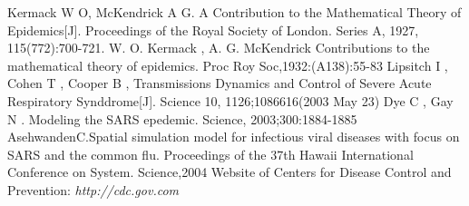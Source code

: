 \begin{thebibliography}{99}

Kermack W O, McKendrick A G. A Contribution to the Mathematical Theory of Epidemics[J]. Proceedings of the Royal Society of London. Series A, 1927, 115(772):700-721.
W. O. Kermack , A. G. McKendrick   Contributions to the mathematical theory of epidemics. Proc Roy Soc,1932:(A138):55-83
Lipsitch I , Cohen T , Cooper B , Transmissions Dynamics and Control of Severe Acute Respiratory Synddrome[J]. Science 10, 1126;1086616(2003 May 23)
Dye C , Gay N . Modeling the SARS epedemic. Science, 2003;300:1884-1885
AsehwandenC.Spatial simulation model for infectious viral diseases with focus on SARS and the common flu. Proceedings of the 37th Hawaii International Conference on System. Science,2004
Website of Centers for Disease Control and Prevention: \emph{http://cdc.gov.com}
\end{thebibliography}
